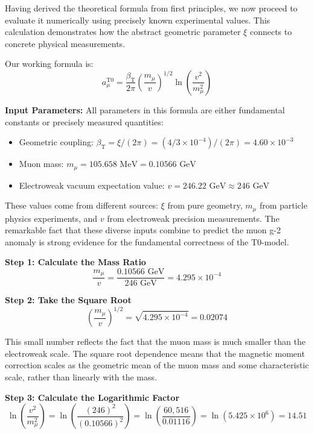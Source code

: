 \documentclass[12pt,a4paper]{article}
\newcommand{\betaT}{\beta_{\text{T}}}
\newcommand{\xipar}{\xi}
\begin{document}
	Having derived the theoretical formula from first principles, we now proceed to evaluate it numerically using precisely known experimental values. This calculation demonstrates how the abstract geometric parameter $\xipar$ connects to concrete physical measurements.
	
	Our working formula is:
	\begin{equation}
		a_\mu^{\text{T0}} = \frac{\betaT}{2\pi} \left(\frac{m_\mu}{v}\right)^{1/2} \ln\left(\frac{v^2}{m_\mu^2}\right)
	\end{equation}
	
	\textbf{Input Parameters:}
	All parameters in this formula are either fundamental constants or precisely measured quantities:
	\begin{itemize}
		\item Geometric coupling: $\betaT = \xipar/(2\pi) = (4/3 \times 10^{-4})/(2\pi) = 4.60 \times 10^{-3}$
		\item Muon mass: $m_\mu = 105.658 \text{ MeV} = 0.10566 \text{ GeV}$
		\item Electroweak vacuum expectation value: $v = 246.22 \text{ GeV} \approx 246 \text{ GeV}$
	\end{itemize}
	
	These values come from different sources: $\xipar$ from pure geometry, $m_\mu$ from particle physics experiments, and $v$ from electroweak precision measurements. The remarkable fact that these diverse inputs combine to predict the muon g-2 anomaly is strong evidence for the fundamental correctness of the T0-model.
	
	\textbf{Step 1: Calculate the Mass Ratio}
	\begin{equation}
		\frac{m_\mu}{v} = \frac{0.10566 \text{ GeV}}{246 \text{ GeV}} = 4.295 \times 10^{-4}
	\end{equation}
	
	\textbf{Step 2: Take the Square Root}
	\begin{equation}
		\left(\frac{m_\mu}{v}\right)^{1/2} = \sqrt{4.295 \times 10^{-4}} = 0.02074
	\end{equation}
	
	This small number reflects the fact that the muon mass is much smaller than the electroweak scale. The square root dependence means that the magnetic moment correction scales as the geometric mean of the muon mass and some characteristic scale, rather than linearly with the mass.
	
	\textbf{Step 3: Calculate the Logarithmic Factor}
	\begin{equation}
		\ln\left(\frac{v^2}{m_\mu^2}\right) = \ln\left(\frac{(246)^2}{(0.10566)^2}\right) = \ln\left(\frac{60,516}{0.01116}\right) = \ln(5.425 \times 10^6) = 14.51
	\end{equation}
	
\end{document}
